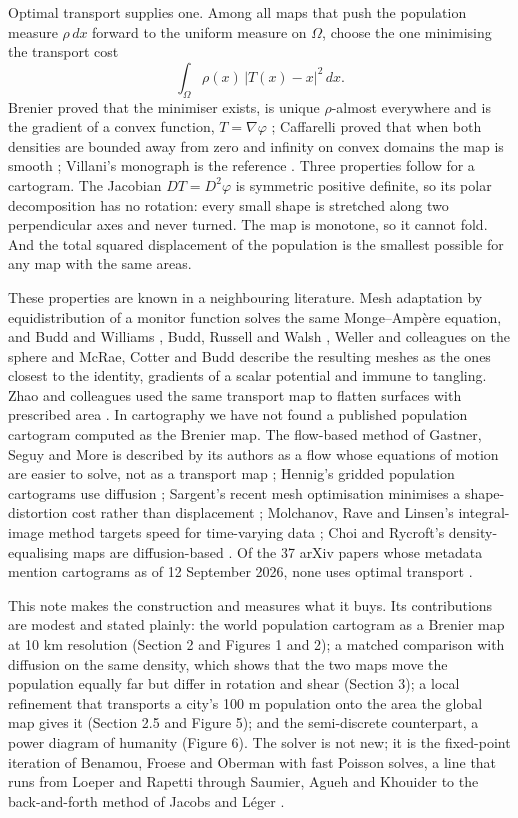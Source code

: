 Optimal transport supplies one. Among all maps that push the population
measure \(\rho\,dx\) forward to the uniform measure on \(\Omega\),
choose the one minimising the transport cost
\[\int_\Omega \rho(x)\,|T(x)-x|^2\,dx .\] Brenier proved that the
minimiser exists, is unique \(\rho\)-almost everywhere and is the
gradient of a convex function, \(T=\nabla\varphi\) \citep{brenier1991};
Caffarelli proved that when both densities are bounded away from zero
and infinity on convex domains the map is smooth \citep{caffarelli1992}; Villani's
monograph is the reference \citep{villani2009}. Three properties follow for a
cartogram. The Jacobian \(DT = D^2\varphi\) is symmetric positive
definite, so its polar decomposition has no rotation: every small shape
is stretched along two perpendicular axes and never turned. The map is
monotone, so it cannot fold. And the total squared displacement of the
population is the smallest possible for any map with the same areas.

These properties are known in a neighbouring literature. Mesh adaptation
by equidistribution of a monitor function solves the same Monge--Ampère
equation, and Budd and Williams \citep{budd2009}, Budd, Russell and Walsh
\citep{budd2015}, Weller and colleagues on the sphere \citep{weller2016} and
McRae, Cotter and Budd \citep{mcrae2018} describe the resulting meshes as the
ones closest to the identity, gradients of a scalar potential and immune
to tangling. Zhao and colleagues used the same transport map to flatten
surfaces with prescribed area \citep{zhao2013}. In cartography we have not
found a published population cartogram computed as the Brenier map. The
flow-based method of Gastner, Seguy and More is described by its authors
as a flow whose equations of motion are easier to solve, not as a
transport map \citep{gastner2018}; Hennig's gridded population cartograms use
diffusion \citep{hennig2013}; Sargent's recent mesh optimisation minimises a
shape-distortion cost rather than displacement \citep{sargent2024}; Molchanov,
Rave and Linsen's integral-image method targets speed for time-varying
data \citep{molchanov2026}; Choi and Rycroft's density-equalising maps are
diffusion-based \citep{choi2018}. Of the 37 arXiv papers whose metadata
mention cartograms as of 12 September 2026, none uses optimal transport
\citep{repo}.

This note makes the construction and measures what it buys. Its
contributions are modest and stated plainly: the world population
cartogram as a Brenier map at 10 km resolution (Section 2 and Figures 1
and 2); a matched comparison with diffusion on the same density, which
shows that the two maps move the population equally far but differ in
rotation and shear (Section 3); a local refinement that transports a
city's 100 m population onto the area the global map gives it (Section
2.5 and Figure 5); and the semi-discrete counterpart, a power diagram of
humanity (Figure 6). The solver is not new; it is the fixed-point
iteration of Benamou, Froese and Oberman \citep{benamou2010} with fast Poisson
solves, a line that runs from Loeper and Rapetti \citep{loeper2005} through
Saumier, Agueh and Khouider \citep{saumier2015} to the back-and-forth method of
Jacobs and Léger \citep{jacobs2020}.

